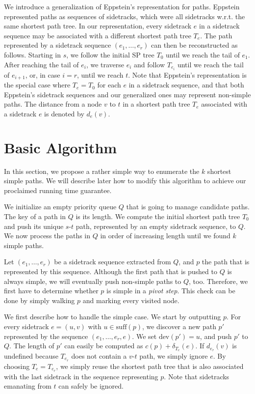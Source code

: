 \documentclass[runningheads,a4paper]{llncs}
\newcommand{\dev}{\text{dev}}
\newcommand{\dist}{d}
\newcommand{\suff}{\text{suff}}
\begin{document}
We introduce a generalization of Eppstein's representation \cite{DBLP:journals/siamcomp/Eppstein98} for paths.
Eppstein represented paths as sequences of sidetracks, which were all sidetracks w.r.t. the same shortest path tree.
In our representation, every sidetrack $e$ in a sidetrack sequence may be associated with a different shortest path tree $T_e$.
The path represented by a sidetrack sequence $(e_1, \ldots, e_r)$ can then be reconstructed as follows.
Starting in $s$, we follow the initial SP tree $T_0$ until we reach the tail of $e_1$.
After reaching the tail of $e_i$, we traverse $e_i$ and follow $T_{e_i}$ until we reach the tail of $e_{i + 1}$, or, in case $i = r$, until we reach $t$.
Note that Eppstein's representation is the special case where $T_e = T_0$ for each $e$ in a sidetrack sequence, and that both Eppstein's sidetrack sequences and our generalized ones may represent non-simple paths.
The distance from a node $v$ to $t$ in a shortest path tree $T_e$ associated with a sidetrack $e$ is denoted by $\dist_e(v)$.


\section{Basic Algorithm}
\label{sec:simple-algo}

In this section, we propose a rather simple way to enumerate the $k$ shortest simple paths.
We will describe later how to modify this algorithm to achieve our proclaimed running time guarantee.

We initialize an empty priority queue $Q$ that is going to manage candidate paths.
The key of a path in $Q$ is its length.
We compute the initial shortest path tree $T_0$ and push its unique $s$-$t$ path, represented by an empty sidetrack sequence, to $Q$.
We now process the paths in $Q$ in order of increasing length until we found $k$ simple paths.

Let $(e_1, \ldots, e_r)$ be a sidetrack sequence extracted from $Q$, and $p$ the path that is represented by this sequence.
Although the first path that is pushed to $Q$ is always simple, we will eventually push non-simple paths to $Q$, too.
Therefore, we first have to determine whether $p$ is simple in a \emph{pivot step}.
This check can be done by simply walking $p$ and marking every visited node.

We first describe how to handle the simple case.
We start by outputting $p$.
For every sidetrack $e = (u, v)$ with $u \in \suff(p)$, we discover a new path $p'$ represented by the sequence $(e_1, \ldots, e_r, e)$.
We set $\dev(p') = u$, and push $p'$ to $Q$.
The length of $p'$ can easily be computed as $c(p) + \delta_{T_e}(e)$.
If $\dist_{e_r}(v)$ is undefined because $T_{e_r}$ does not contain a $v$-$t$ path, we simply ignore $e$.
By choosing $T_e = T_{e_r}$, we simply reuse the shortest path tree that is also associated with the last sidetrack in the sequence representing $p$.
Note that sidetracks emanating from $t$ can safely be ignored.
\end{document}
